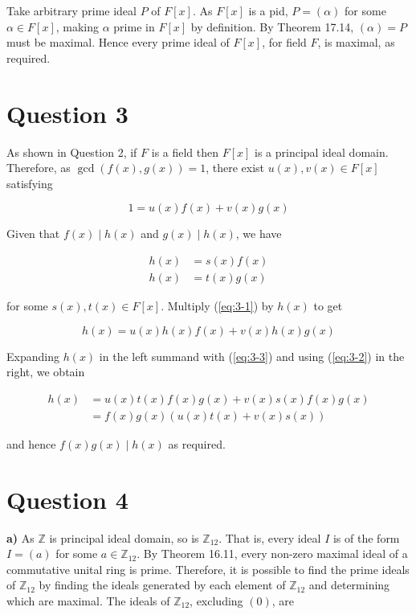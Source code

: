 \documentclass{article}
\begin{document}
\hfill\break
Take arbitrary prime ideal $P$ of $F[x]$. As $F[x]$ is a pid, $P = (\alpha)$ for some
$\alpha \in F[x]$, making $\alpha$ prime in $F[x]$ by definition. By
Theorem 17.14, $(\alpha) = P$ must be maximal. Hence every prime ideal of $F[x]$,
for field $F$, is maximal, as required.

\section*{Question 3}

As shown in Question 2, if $F$ is a field then $F[x]$ is a principal ideal domain.
Therefore, as $\gcd(f(x), g(x)) = 1$, there exist $u(x), v(x) \in F[x]$ satisfying

\begin{equation} \label{eq:3-1}
    1 = u(x)f(x) + v(x)g(x)
\end{equation}

Given that $f(x)\mid h(x)$ and $g(x)\mid h(x)$, we have

\begin{align}
    h(x) &= s(x)f(x) \label{eq:3-2}\\
    h(x) &= t(x)g(x) \label{eq:3-3}
\end{align}

for some $s(x), t(x) \in F[x]$. Multiply (\ref{eq:3-1}) by $h(x)$ to get

\begin{equation}
    h(x) = u(x)h(x)f(x) + v(x)h(x)g(x) \label{eq:3-4}
\end{equation}

Expanding $h(x)$ in the left summand with (\ref{eq:3-3}) and using
(\ref{eq:3-2}) in the right, we obtain

\begin{align*}
    h(x) &= u(x)t(x)f(x)g(x) + v(x)s(x)f(x)g(x)\\
    &= f(x)g(x)(u(x)t(x) + v(x)s(x))
\end{align*}

and hence $f(x)g(x)\mid h(x)$ as required.

\section*{Question 4}

\textbf{a)} As $\mathbb{Z}$ is principal ideal domain, so is $\mathbb{Z}_{12}$. That is,
every ideal $I$ is of the form $I = (a)$ for some $a \in \mathbb{Z}_{12}$. By Theorem 16.11,
every non-zero maximal ideal of a commutative unital ring is prime. Therefore, it is
possible to find the prime ideals of $\mathbb{Z}_{12}$ by finding the ideals generated
by each element of $\mathbb{Z}_{12}$ and determining which are maximal. The ideals of
$\mathbb{Z}_{12}$, excluding $(0)$, are
\end{document}
